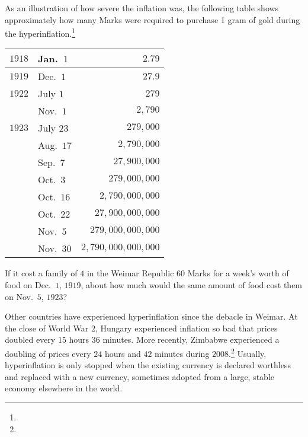 \documentclass{ximera}
\begin{document}
As an illustration of how severe the inflation was, the following table shows approximately how many Marks were required to purchase 1 gram of gold during the hyperinflation.\footnote{}

\begin{center}
\begin{tabular}{@{}llr@{}}\toprule
\textbf{$1918$} & Jan.\ $1$ & $2.79$ \\\midrule
\textbf{$1919$} & Dec.\ $1$ & $27.9$\\\midrule
\textbf{$1922$} & July $1$ & $279$\\
 & Nov.\ $1$ & $2,790$\\\midrule
 \textbf{$1923$} & July $23$ & $279,000$\\
 & Aug.\ $17$ & $2,790,000$\\
 &  Sep.\ $7$ & $27,900,000$\\
 & Oct.\ $3$ & $279,000,000$\\
 & Oct.\ $16$ & $2,790,000,000$\\
 &  Oct.\ $22$ & $27,900,000,000$\\
 & Nov.\ $5$ & $279,000,000,000$\\
 & Nov.\ $30$ & $2,790,000,000,000$\\\bottomrule
\end{tabular}
\end{center}

\begin{question}
If it cost a family of $4$ in the Weimar Republic $60$ Marks for a week's worth of food on Dec.\ $1$, $1919$, about how much would the same amount of food cost them on Nov.\ $5$, $1923$?

\begin{multipleChoice}
\end{multipleChoice}
	
\end{question}

Other countries have experienced hyperinflation since the debacle in Weimar. At the close of World War $2$, Hungary experienced inflation so bad that prices doubled every $15$ hours $36$ minutes. More recently, Zimbabwe experienced a doubling of prices every $24$ hours and $42$ minutes during $2008$.\footnote{} Usually, hyperinflation is only stopped when the existing currency is declared worthless and replaced with a new currency, sometimes adopted from a large, stable economy elsewhere in the world.
\end{document}
